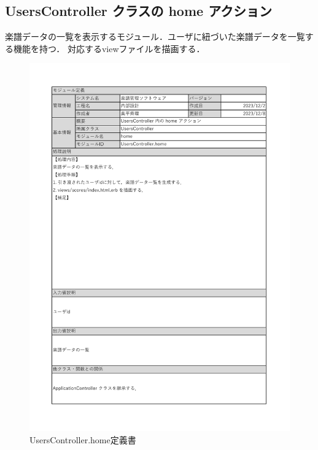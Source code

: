 \subsection*{UsersController クラスの home アクション}
楽譜データの一覧を表示するモジュール．ユーザに紐づいた楽譜データを一覧する機能を持つ．
対応するviewファイルを描画する．
\begin{figure}[H]
    \centering
    \includegraphics[scale=0.6]{img/Users/xlsx/UsersController_home.pdf}
    \vspace{-1cm}
    \caption{UsersController.home定義書}
\end{figure}
